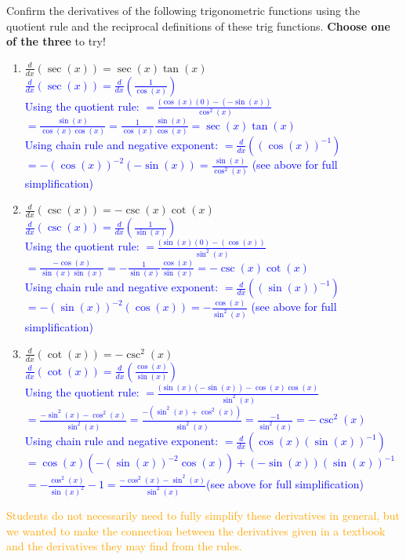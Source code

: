 \documentclass{ximera}
\begin{document}
\begin{exercise}
    Confirm the derivatives of the following trigonometric functions using the quotient rule and the reciprocal definitions of these trig functions.  \textbf{Choose one of the three} to try! 
    \begin{enumerate}
        \item $\frac{d}{dx}(\sec(x))=\sec(x)\tan(x)$\\
        \textcolor{blue}{ $\frac{d}{dx}(\sec(x))=\frac{d}{dx}(\frac{1}{\cos(x)})$\\
        Using the quotient rule: $=\frac{(\cos(x)(0)-(-\sin(x))}{\cos^2(x)}$\\
        $=\frac{\sin(x)}{\cos(x)\cos(x)}=\frac{1}{\cos(x)}\frac{\sin(x)}{\cos(x)}=\sec(x)\tan(x)$\\
        Using chain rule and negative exponent: $=\frac{d}{dx}((\cos(x))^{-1})$\\
        $=-(\cos(x))^{-2}(-\sin(x))=\frac{\sin(x)}{\cos^2(x)}$ (see above for full simplification)}

        \item $\frac{d}{dx}(\csc(x))=-\csc(x)\cot(x)$\\
        \textcolor{blue}{ $\frac{d}{dx}(\csc(x))=\frac{d}{dx}(\frac{1}{\sin(x)})$\\
        Using the quotient rule: $=\frac{(\sin(x)(0)-(\cos(x))}{\sin^2(x)}$\\
        $=\frac{-\cos(x)}{\sin(x)\sin(x)}=-\frac{1}{\sin(x)}\frac{\cos(x)}{\sin(x)}=-\csc(x)\cot(x)$\\
        Using chain rule and negative exponent: $=\frac{d}{dx}((\sin(x))^{-1})$\\
        $=-(\sin(x))^{-2}(\cos(x))=-\frac{\cos(x)}{\sin^2(x)}$ (see above for full simplification)}

        \item $\frac{d}{dx}(\cot(x))=-\csc^2(x)$\\
        \textcolor{blue}{ $\frac{d}{dx}(\cot(x))=\frac{d}{dx}(\frac{\cos(x)}{\sin(x)})$\\
        Using the quotient rule: $=\frac{(\sin(x)(-\sin(x))-\cos(x)\cos(x)}{\sin^2(x)}$\\
        $=\frac{-\sin^2(x)-\cos^2(x)}{\sin^2(x)}=\frac{-(\sin^2(x)+\cos^2(x))}{\sin^2(x)}=\frac{-1}{\sin^2(x)}=-\csc^2(x)$\\
        Using chain rule and negative exponent: $=\frac{d}{dx}(\cos(x)(\sin(x))^{-1})$\\
        $=\cos(x)(-(\sin(x))^{-2}\cos(x))+(-\sin(x))(\sin(x))^{-1}$\\
        $=-\frac{\cos^2(x)}{\sin(x)^2}-1=\frac{-\cos^2(x)-\sin^2(x)}{\sin^2(x)}$(see above for full simplification)}
    \end{enumerate}
    \textcolor{orange}{Students do not necessarily need to fully simplify these derivatives in general, but we wanted to make the connection between the derivatives given in a textbook and the derivatives they may find from the rules.}
\end{exercise}
\end{document}
